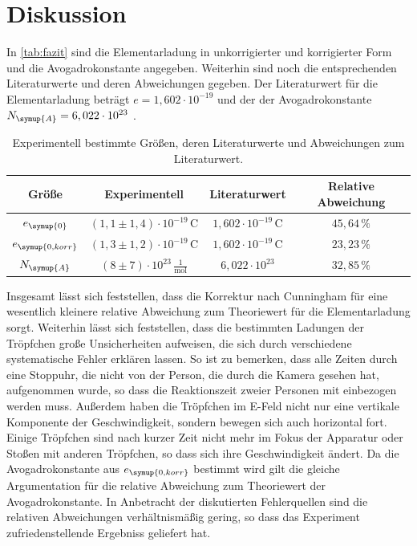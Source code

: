 \section{Diskussion}
\label{sec:Diskussion}
In \autoref{tab:fazit} sind die Elementarladung in unkorrigierter und korrigierter Form und die Avogadrokonstante
angegeben. Weiterhin sind noch die entsprechenden Literaturwerte und deren Abweichungen gegeben. Der Literaturwert
für die Elementarladung beträgt $e=1,602\cdot 10^{-19}$ \cite{e} und der der Avogadrokonstante $N_{\symup{A}}=
6,022\cdot 10^{23}$ \cite{avogadro}.
\begin{table}
    \centering
    \caption{Experimentell bestimmte Größen, deren Literaturwerte und Abweichungen zum Literaturwert.}
    \label{tab:fazit}
    \begin{tabular}{c | c c c}
        \toprule
        Größe & Experimentell & Literaturwert & Relative Abweichung \\
        \midrule
        $e_{\symup{0}}$         & $(1,1 \pm 1,4)\cdot 10^{-19}\,\si{\coulomb}$  & $1,602\cdot 10^{-19}\,\si{\coulomb}$  & $45,64\,\%$ \\
        $e_{\symup{0, korr}}$   & $(1,3 \pm 1,2)\cdot 10^{-19}\,\si{\coulomb}$  & $1,602\cdot 10^{-19}\,\si{\coulomb}$  & $23,23\,\%$ \\
        $N_{\symup{A}}$         & $(8 \pm 7)\cdot 10^{23}\,\frac{1}{\si{\mol}}$ & $6,022\cdot 10^{23}$                  & $32,85\,\%$ \\ 
        \bottomrule
    \end{tabular}
\end{table}
Insgesamt lässt sich feststellen, dass die Korrektur nach Cunningham für eine wesentlich kleinere relative
Abweichung zum Theoriewert für die Elementarladung sorgt. Weiterhin lässt sich feststellen, dass die bestimmten
Ladungen der Tröpfchen große Unsicherheiten aufweisen, die sich durch verschiedene systematische Fehler erklären
lassen. So ist zu bemerken, dass alle Zeiten durch eine Stoppuhr, die nicht von der Person, die durch die Kamera
gesehen hat, aufgenommen wurde, so dass die Reaktionszeit zweier Personen mit einbezogen werden muss. Außerdem
haben die Tröpfchen im E-Feld nicht nur eine vertikale Komponente der Geschwindigkeit, sondern bewegen sich auch
horizontal fort. Einige Tröpfchen sind nach kurzer Zeit nicht mehr im Fokus der Apparatur oder Stoßen mit anderen
Tröpfchen, so dass sich ihre Geschwindigkeit ändert.
Da die Avogadrokonstante aus $e_{\symup{0, korr}}$ bestimmt wird gilt die gleiche Argumentation für die
relative Abweichung zum Theoriewert der Avogadrokonstante. 
In Anbetracht der diskutierten Fehlerquellen sind die relativen Abweichungen verhältnismäßig gering, so dass
das Experiment zufriedenstellende Ergebniss geliefert hat.

